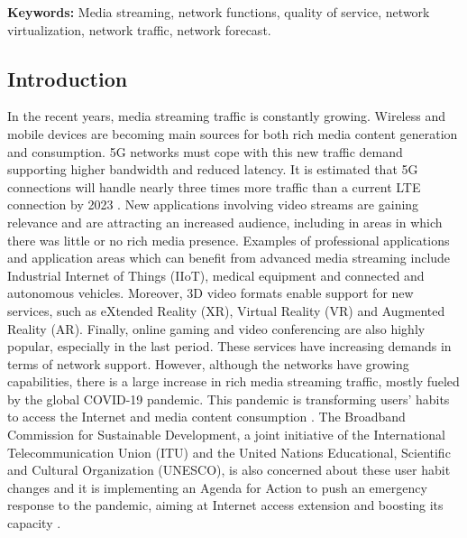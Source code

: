 \textbf{Keywords:} Media streaming, network functions, quality of service, network virtualization, network traffic, network forecast.
		
\subsection{Introduction}
\label{sec:IEEECOMSTintro}
	
In the recent years, media streaming traffic is constantly growing. 
Wireless and mobile devices are becoming main sources for both rich media content generation and consumption. 5G networks must cope with this new traffic demand supporting higher bandwidth and reduced latency. It is estimated that 5G connections will handle nearly three times more traffic than a current LTE connection by 2023 \cite{Cisco2020}.
New applications involving video streams are gaining relevance and are attracting an increased audience, including in areas in which there was little or no rich media presence. Examples of professional applications and application areas which can benefit from advanced media streaming include Industrial Internet of Things (IIoT), medical equipment and connected and autonomous vehicles.
Moreover, 3D video formats enable support for new services, such as eXtended Reality (XR), Virtual Reality (VR) and Augmented Reality (AR). Finally, online gaming and video conferencing are also highly popular, especially in the last period. These services have increasing demands in terms of network support. However, although the networks have growing capabilities, there is a large increase in rich media streaming traffic, mostly fueled by the global COVID-19 pandemic. This pandemic is transforming users' habits to access the Internet \cite{Lutu2020, Feldmann2020} and media content consumption \cite{Favale2020, King2020}. The Broadband Commission for Sustainable Development, a joint initiative of the International Telecommunication Union (ITU) and the United Nations Educational, Scientific and Cultural Organization (UNESCO), is also concerned about these user habit changes and it is implementing an Agenda for Action to push an emergency response to the pandemic, aiming at Internet access extension and boosting its capacity \cite{BroadbandCommission, ICTaffordability}.

